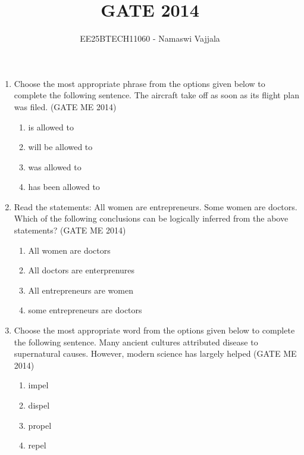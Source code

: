 \documentclass[journal]{IEEEtran}
\numberwithin{equation}{enumi}
\numberwithin{figure}{enumi}
\begin{document}

\vspace{3cm}

\title{GATE 2014}
\author{EE25BTECH11060 - Namaswi Vajjala}
\maketitle

\begin{enumerate}
\item 
Choose the most appropriate phrase from the options given below to complete the following sentence. The aircraft take off as soon as its flight plan was filed.
\hfill{(GATE ME 2014)}
\begin{multicols}{2}
\begin{enumerate}
    \item  is allowed to
    \item will be allowed to
    \item was allowed to
    \item has been allowed to
\end{enumerate} 
\end{multicols}

\item  Read the statements:
All women are entrepreneurs.
Some women are doctors.
Which of the following conclusions can be logically inferred from the above statements?
\hfill{(GATE ME 2014)}
\begin{multicols}{2}
 \begin{enumerate}
        \item  All women are doctors
        \item All doctors are enterprenures
        \item All entrepreneurs are women
        \item some entrepreneurs are doctors
 \end{enumerate}
\end{multicols}

\item Choose the most appropriate word from the options given below to complete the following sentence.
Many ancient cultures attributed disease to supernatural causes. However, modern science has largely helped
\hfill{(GATE ME 2014)}
\begin{multicols}{4}
    \begin{enumerate}
        \item impel
        \item dispel
        \item propel
        \item repel
    \end{enumerate}
\end{multicols}


\end{enumerate}
\end{document}

